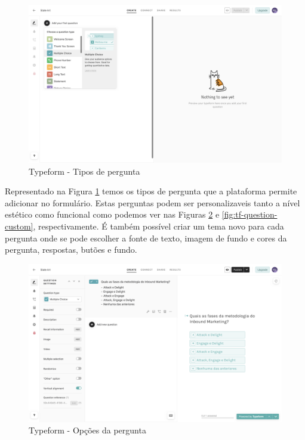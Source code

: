 \begin{figure}[ht!]
	\begin{center}
		\includegraphics[width=1\textwidth]{img/tf/tf-question-type}
		\caption{Typeform - Tipos de pergunta}
		\label{fig:tf-question-type}
	\end{center}
\end{figure}

Representado na Figura \ref{fig:tf-question-type} temos os tipos de pergunta que a plataforma permite adicionar no formulário. Estas perguntas podem ser personalizaveis tanto a nível estético como funcional como podemos ver nas Figuras \ref{fig:tf-question-opcoes} e \ref{fig:tf-question-custom}, respectivamente. É também possível criar um tema novo para cada pergunta onde se pode escolher a fonte de texto, imagem de fundo e cores da pergunta, respostas, butões e fundo.

\begin{figure}[ht!]
	\begin{center}
		\includegraphics[width=1\textwidth]{img/tf/tf-question-opcoes}
		\caption{Typeform - Opções da pergunta}
		\label{fig:tf-question-opcoes}
	\end{center}
\end{figure}

